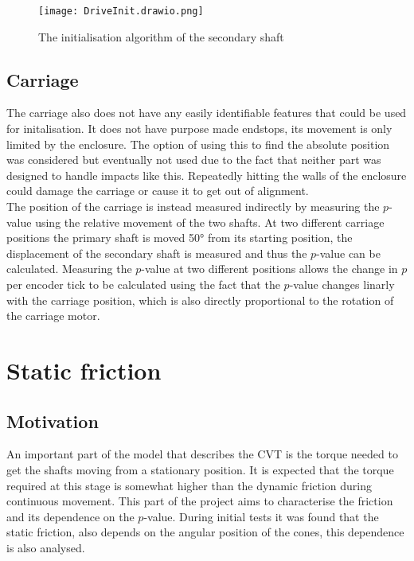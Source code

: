 \documentclass[12pt]{article}
\begin{document}
\begin{figure}
    \centering
    \texttt{[image: DriveInit.drawio.png]}
    \caption{The initialisation algorithm of the secondary shaft}
    \label{fig:driveInit}
\end{figure}


\subsection{Carriage}
The carriage also does not have any easily identifiable features that could be used for initalisation. It does not have purpose made endstops, its movement is only limited by the enclosure. The option of using this to find the absolute position was considered but eventually not used due to the fact that neither part was designed to handle impacts like this. Repeatedly hitting the walls of the enclosure could damage the carriage or cause it to get out of alignment.\\
The position of the carriage is instead measured indirectly by measuring the $p$-value using the relative movement of the two shafts. At two different carriage positions the primary shaft is moved 50° from its starting position, the displacement of the secondary shaft is measured and thus the $p$-value can be calculated. Measuring the $p$-value at two different positions allows the change in $p$ per encoder tick to be calculated using the fact that the $p$-value changes linarly with the carriage position, which is also directly proportional to the rotation of the carriage motor. 
 

\pagebreak
\section{Static friction}
\subsection{Motivation}
An important part of the model that describes the CVT is the torque needed to get the shafts moving from a stationary position. It is expected that the torque required at this stage is somewhat higher than the dynamic friction during continuous movement. This part of the project aims to characterise the friction and its dependence on the $p$-value. During initial tests it was found that the static friction, also depends on the angular position of the cones, this dependence is also analysed. 
\end{document}

